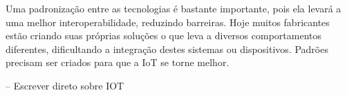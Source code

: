 Uma padronização entre as tecnologias é bastante importante, pois ela levará a uma melhor interoperabilidade, reduzindo barreiras. Hoje muitos fabricantes estão criando suas próprias soluções o que leva a diversos comportamentos diferentes, dificultando a integração destes sistemas ou dispositivos. Padrões precisam ser criados para que a IoT se torne melhor.




-- Escrever direto sobre IOT